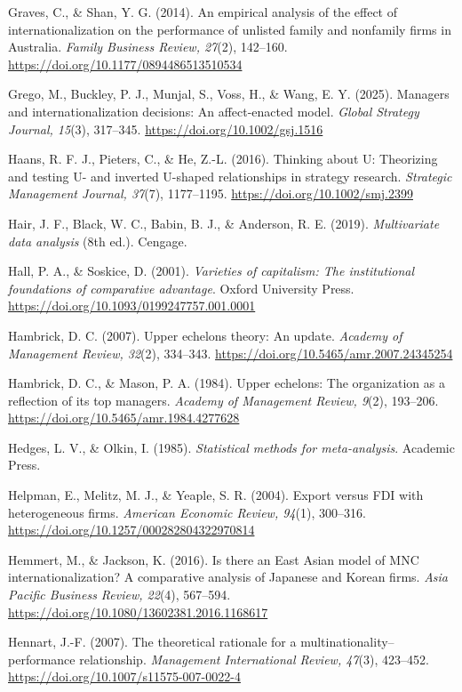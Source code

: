 \documentclass[
  a4paper,
  13pt]{extreport}
\begin{document}
Graves, C., \& Shan, Y. G. (2014). An empirical analysis of the effect
of internationalization on the performance of unlisted family and
nonfamily firms in Australia. \emph{Family Business Review, 27}(2),
142--160. \url{https://doi.org/10.1177/0894486513510534}

Grego, M., Buckley, P. J., Munjal, S., Voss, H., \& Wang, E. Y. (2025).
Managers and internationalization decisions: An affect-enacted model.
\emph{Global Strategy Journal, 15}(3), 317--345.
\url{https://doi.org/10.1002/gsj.1516}

Haans, R. F. J., Pieters, C., \& He, Z.-L. (2016). Thinking about U:
Theorizing and testing U- and inverted U-shaped relationships in
strategy research. \emph{Strategic Management Journal, 37}(7),
1177--1195. \url{https://doi.org/10.1002/smj.2399}

Hair, J. F., Black, W. C., Babin, B. J., \& Anderson, R. E. (2019).
\emph{Multivariate data analysis} (8th ed.). Cengage.

Hall, P. A., \& Soskice, D. (2001). \emph{Varieties of capitalism: The
institutional foundations of comparative advantage}. Oxford University
Press. \url{https://doi.org/10.1093/0199247757.001.0001}

Hambrick, D. C. (2007). Upper echelons theory: An update. \emph{Academy
of Management Review, 32}(2), 334--343.
\url{https://doi.org/10.5465/amr.2007.24345254}

Hambrick, D. C., \& Mason, P. A. (1984). Upper echelons: The
organization as a reflection of its top managers. \emph{Academy of
Management Review, 9}(2), 193--206.
\url{https://doi.org/10.5465/amr.1984.4277628}

Hedges, L. V., \& Olkin, I. (1985). \emph{Statistical methods for
meta-analysis}. Academic Press.

Helpman, E., Melitz, M. J., \& Yeaple, S. R. (2004). Export versus FDI
with heterogeneous firms. \emph{American Economic Review, 94}(1),
300--316. \url{https://doi.org/10.1257/000282804322970814}

Hemmert, M., \& Jackson, K. (2016). Is there an East Asian model of MNC
internationalization? A comparative analysis of Japanese and Korean
firms. \emph{Asia Pacific Business Review, 22}(4), 567--594.
\url{https://doi.org/10.1080/13602381.2016.1168617}

Hennart, J.-F. (2007). The theoretical rationale for a
multinationality--performance relationship. \emph{Management
International Review, 47}(3), 423--452.
\url{https://doi.org/10.1007/s11575-007-0022-4}
\end{document}
